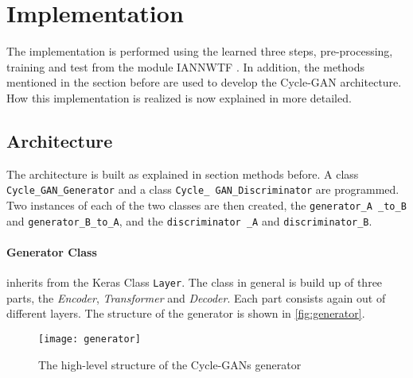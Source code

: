 \documentclass[fleqn,10pt]{SelfArx} %
\begin{document}
\section{Implementation}
The implementation is performed using the learned three steps, pre-processing, training and test from the module \ac{IANNWTF} \cite{implementingANsCourseware02, implementingANsCourseware03}. In addition, the methods mentioned in the section before are used to develop the Cycle-\ac{GAN} architecture. How this implementation is realized is now explained in more detailed.

\subsection{Architecture}
The architecture is built as explained in section methods before. A class \texttt{Cycle\_GAN\_Generator} and a class \texttt{Cycle\_ GAN\_Discriminator} are programmed. Two instances of each of the two classes are then created, the \texttt{generator\_A \_to\_B} and \texttt{generator\_B\_to\_A}, and the \texttt{discriminator \_A} and \texttt{discriminator\_B}.

\paragraph{Generator Class} inherits from the Keras Class \texttt{Layer}. The class in general is build up of three parts, the \textit{Encoder}, \textit{Transformer} and \textit{Decoder}. Each part consists again out of different layers. The structure of the generator is shown in \autoref{fig:generator}. \cite{Introduction-to-Cycle-GANs}

\begin{figure*}[htb] 
	\centering 
	\texttt{[image: generator]}
	\caption{The high-level structure of the Cycle-\ac{GAN}s generator \cite{Introduction-to-Cycle-GANs}}
	\label{fig:generator}
\end{figure*}
\end{document}
